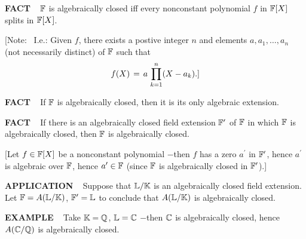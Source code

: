 \begin{x}{\small\bf FACT} \ %
$\mathbb{F}$ is algebraically closed iff every nonconstant polynomial $f$ in $\mathbb{F}[X]$ splits in $\mathbb{F}[X]$.

\vspace{0.1cm}

[Note: \ I.e.: Given $f$, there exists a postive integer $n$ and elements 
$a, a_1, \ldots, a_n$ (not necessarily distinct) of $\mathbb{F}$ such that 
\[
f(X) \hspace{0.05cm} = \hspace{0.05cm} a \hspace{0.05cm} \prod\limits_{k = 1}^n (X - a_k).]
\]
\end{x}

\vspace{0.1cm}


\begin{x}{\small\bf FACT} \ %
If $\mathbb{F}$ is algebraically closed, then it is its only algebraic extension.
\end{x}

\vspace{0.1cm}


\begin{x}{\small\bf FACT} \ %
If there is an algebraically closed field extension $\mathbb{F}^\prime$ of $\mathbb{F}$ in which $\mathbb{F}$ is algebraically closed, then 
$\mathbb{F}$ is algebraically closed.

\vspace{0.1cm}

[Let $f \in \mathbb{F}[X]$ be a nonconstant polynomial $-$then $f$ has a zero $a^\prime$ in $\mathbb{F}^\prime$, hence 
$a^\prime$ is algebraic over $\mathbb{F}$, hence $a^\prime \in \mathbb{F}$ (since $\mathbb{F}$ is algebraically closed in $\mathbb{F}^\prime$).]
\end{x}

\vspace{0.1cm}


\begin{x}{\small\bf APPLICATION} \ %
Suppose that $\mathbb{L}/\mathbb{K}$ is an algebraically closed field extension.  
Let $\mathbb{F} = A(\mathbb{L}/\mathbb{K})$, $\mathbb{F}^\prime = \mathbb{L}$ to conclude that $A(\mathbb{L}/\mathbb{K})$ is algebraically closed.
\end{x}

\vspace{0.1cm}

\begin{x}{\small\bf EXAMPLE} \ %
Take $\mathbb{K} = \mathbb{Q}$, $\mathbb{L} = \mathbb{C}$ $-$then $\mathbb{C}$ is algebraically closed, hence $A(\mathbb{C}/\mathbb{Q})$ is algebraically closed.
\end{x}

\vspace{0.1cm}



